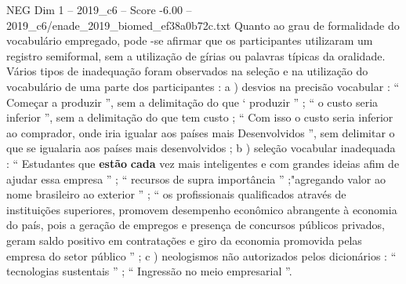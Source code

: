 \begin{textsample}{NEG Dim 1 – 2019\_c6 – Score -6.00 – 2019\_c6/enade\_2019\_biomed\_ef38a0b72c.txt}
Quanto ao grau de formalidade do vocabulário empregado, pode -se afirmar que os participantes utilizaram um registro semiformal, sem a utilização de gírias ou palavras típicas da oralidade.
Vários tipos de inadequação foram observados na seleção e na utilização do vocabulário de uma parte dos participantes : a ) desvios na precisão vocabular : “ Começar a produzir ”, sem a delimitação do que ‘ produzir ” ; “ o custo seria inferior ”, sem a delimitação do que tem custo ; “ Com isso o custo seria inferior ao comprador, onde iria igualar aos países mais Desenvolvidos ”, sem delimitar o que se igualaria aos países mais desenvolvidos ; b ) seleção vocabular inadequada : “ Estudantes que \textbf{estão} \textbf{cada} vez mais inteligentes e com grandes ideias afim de ajudar essa empresa ” ; “ recursos de supra importância ” ;"agregando valor ao nome brasileiro ao exterior ” ; “ os profissionais qualificados através de instituições superiores, promovem desempenho econômico abrangente à economia do país, pois a geração de empregos e presença de concursos públicos privados, geram saldo positivo em contratações e giro da economia promovida pelas empresa do setor público ” ; c ) neologismos não autorizados pelos dicionários : “ tecnologias sustentais ” ; “ Ingressão no meio empresarial ”.

\end{textsample}
